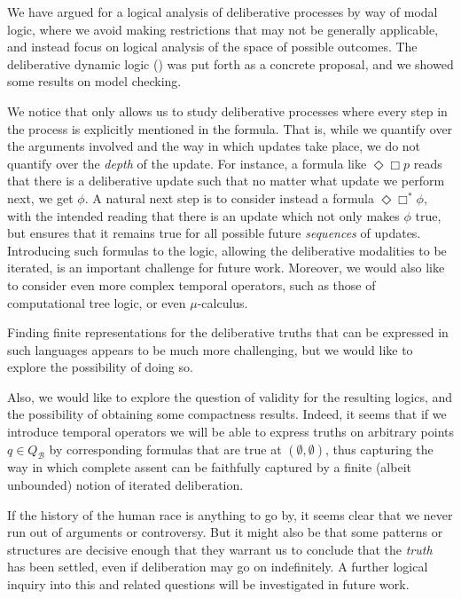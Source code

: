 \documentclass{llncs}
\newcommand{\carriers}[1]{Q_{#1}}
\newcommand{\views}{\mathcal B}
\begin{document}
We have argued for a logical analysis of deliberative processes by way of modal logic, where we avoid making restrictions that may not be generally applicable, and instead focus on logical analysis of the space of possible outcomes. The deliberative dynamic logic () was put forth as a concrete proposal, and we showed some results on model checking.

We notice that  only allows us to study deliberative processes where every step in the process is explicitly mentioned in the formula. That is, while we quantify over the arguments involved and the way in which updates take place, we do not quantify over the \emph{depth} of the update. For instance, a formula like $\Diamond \Box p$ reads that there is a deliberative update such that no matter what update we perform next, we get $\phi$. A natural next step is to consider instead a formula $\Diamond \Box^\ast \phi$, with the intended reading that there is an update which not only makes $\phi$ true, but ensures that it remains true for all possible future \emph{sequences} of updates. Introducing such formulas to the logic, allowing the deliberative modalities to be iterated, is an important challenge for future work.  Moreover, we would also like to consider even more complex temporal operators, such as those of computational tree logic, or even $\mu$-calculus.

Finding finite representations for the deliberative truths that can be expressed in such languages appears to be much more challenging, but we would like to explore the possibility of doing so.

Also, we would like to explore the question of validity for the resulting logics, and the possibility of obtaining some compactness results. Indeed, it seems that if we introduce temporal operators we will be able to express truths on arbitrary points $q \in \carriers \views$ by corresponding formulas that are true at $(\emptyset,\emptyset)$, thus capturing the way in which complete assent can be faithfully captured by a finite (albeit unbounded) notion of iterated deliberation. 

If the history of the human race is anything to go by, it seems clear that we never run out of arguments or controversy. But it might also be that some patterns or structures are decisive enough that they warrant us to conclude that the \emph{truth} has been settled, even if deliberation may go on indefinitely. A further logical inquiry into this and related questions will be investigated in future work.



\end{document}
